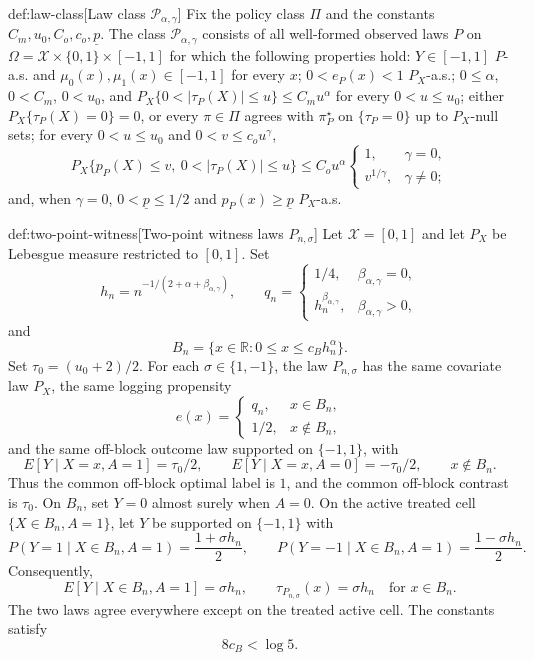 \begin{definitionv}{def:law-class}[Law class \(\mathcal P_{\alpha,\gamma}\)]
Fix the policy class \(\Pi\) and the constants \(C_m,u_0,C_o,c_o,\underline p\). The class \(\mathcal P_{\alpha,\gamma}\) consists of all well-formed observed laws \(P\) on \(\Omega=\mathcal X\times\{0,1\}\times[-1,1]\) for which the following properties hold: \(Y\in[-1,1]\) \(P\)-a.s. and \(\mu_0(x),\mu_1(x)\in[-1,1]\) for every \(x\); \(0<e_P(x)<1\) \(P_X\)-a.s.; \(0\le\alpha\), \(0<C_m\), \(0<u_0\), and \(P_X\{0<|\tau_P(X)|\le u\}\le C_m u^\alpha\) for every \(0<u\le u_0\); either \(P_X\{\tau_P(X)=0\}=0\), or every \(\pi\in\Pi\) agrees with \(\pi^\star_P\) on \(\{\tau_P=0\}\) up to \(P_X\)-null sets; for every \(0<u\le u_0\) and \(0<v\le c_o u^\gamma\), \[P_X\{p_P(X)\le v,\ 0<|\tau_P(X)|\le u\}\le C_o u^\alpha\begin{cases}1,&\gamma=0,\\ v^{1/\gamma},&\gamma\ne0;\end{cases}\] and, when \(\gamma=0\), \(0<\underline p\le1/2\) and \(p_P(x)\ge\underline p\) \(P_X\)-a.s.
\end{definitionv}

\begin{definitionv}{def:two-point-witness}[Two-point witness laws \(P_{n,\sigma}\)]
Let \(\mathcal X=[0,1]\) and let \(P_X\) be Lebesgue measure restricted to \([0,1]\). Set
\[
h_n=n^{-1/(2+\alpha+\beta_{\alpha,\gamma})},
\qquad
q_n=
\begin{cases}
1/4, & \beta_{\alpha,\gamma}=0,\\
h_n^{\beta_{\alpha,\gamma}}, & \beta_{\alpha,\gamma}>0,
\end{cases}
\]
and
\[
B_n=\{x\in\mathbb R:0\le x\le c_Bh_n^\alpha\}.
\]
Set \(\tau_0=(u_0+2)/2\). For each \(\sigma\in\{1,-1\}\), the law \(P_{n,\sigma}\) has the same covariate law \(P_X\), the same logging propensity
\[
e(x)=
\begin{cases}
q_n, & x\in B_n,\\
1/2, & x\notin B_n,
\end{cases}
\]
and the same off-block outcome law supported on \(\{-1,1\}\), with
\[
E[Y\mid X=x,A=1]=\tau_0/2,
\qquad
E[Y\mid X=x,A=0]=-\tau_0/2,
\qquad x\notin B_n .
\]
Thus the common off-block optimal label is \(1\), and the common off-block contrast is \(\tau_0\). On \(B_n\), set \(Y=0\) almost surely when \(A=0\). On the active treated cell \(\{X\in B_n,A=1\}\), let \(Y\) be supported on \(\{-1,1\}\) with
\[
P(Y=1\mid X\in B_n,A=1)=\frac{1+\sigma h_n}{2},
\qquad
P(Y=-1\mid X\in B_n,A=1)=\frac{1-\sigma h_n}{2}.
\]
Consequently,
\[
E[Y\mid X\in B_n,A=1]=\sigma h_n,
\qquad
\tau_{P_{n,\sigma}}(x)=\sigma h_n
\quad\text{for }x\in B_n .
\]
The two laws agree everywhere except on the treated active cell. The constants satisfy
\[
8c_B<\log 5 .
\]
\end{definitionv}

